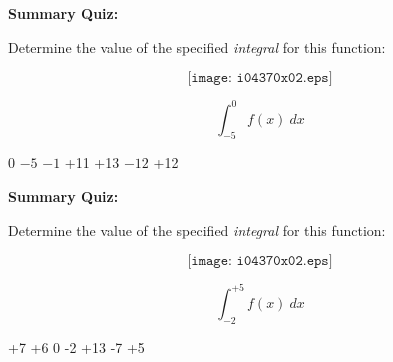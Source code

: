 \vfil \eject

\noindent
{\bf Summary Quiz:}

Determine the value of the specified {\it integral} for this function:

$$\texttt{[image: i04370x02.eps]}$$

$$\int_{-5}^{0} f(x) \> dx$$

\vskip 10pt

0 \hskip 40pt $-5$ \hskip 40pt $-1$  \hskip 40pt +11  \hskip 40pt +13  \hskip 40pt $-12$ \hskip 40pt +12



\vfil \eject

\noindent
{\bf Summary Quiz:}

Determine the value of the specified {\it integral} for this function:

$$\texttt{[image: i04370x02.eps]}$$

$$\int_{-2}^{+5} f(x) \> dx$$

\vskip 10pt

+7 \hskip 40pt +6 \hskip 40pt 0  \hskip 40pt -2  \hskip 40pt +13  \hskip 40pt -7 \hskip 40pt +5





